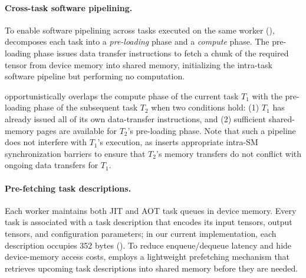 \paragraph{Cross-task software pipelining.}
To enable software pipelining across tasks executed on the same worker (), \sys decomposes each task into a {\em pre-loading} phase and a {\em compute} phase. The pre-loading phase issues data transfer instructions to fetch a chunk of the required tensor from device memory into shared memory, initializing the intra-task software pipeline but performing no computation.
%

\Sys opportunistically overlaps the compute phase of the current task $T_1$ with the pre-loading phase of the subsequent task $T_2$ when two conditions hold: (1) $T_1$ has already issued all of its own data-transfer instructions, and (2) sufficient shared-memory pages are available for $T_2$'s pre-loading phase. Note that such a pipeline does not interfere with $T_1$'s execution, as \sys inserts appropriate intra-SM synchronization barriers to ensure that $T_2$’s memory transfers do not conflict with ongoing data transfers for $T_1$. 

\paragraph{Pre-fetching task descriptions.}
Each worker maintains both JIT and AOT task queues in device memory. Every task is associated with a task description that encodes its input tensors, output tensors, and configuration parameters; in our current implementation, each description occupies 352 bytes (). To reduce enqueue/dequeue latency and hide device-memory access costs, \sys employs a lightweight prefetching mechanism that retrieves upcoming task descriptions into shared memory before they are needed.
